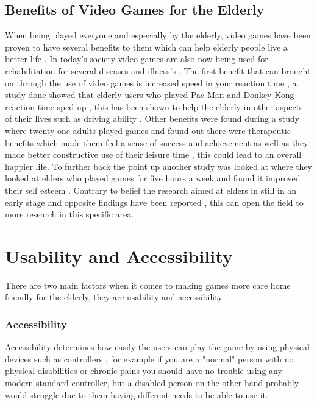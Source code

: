 \documentclass[journal]{IEEEtran}
\begin{document}
\subsection{Benefits of Video Games for the Elderly}
When being played everyone and especially by the elderly, video games have been proven to have several benefits to them which can help elderly people live a better life \cite{noauthor_video_nodate}. In today's society video games are also now being used for rehabilitation for several diseases and illness's \cite{hansen_robot_2011} \cite{gerling_long-term_2015}. The first benefit that can brought on through the use of video games is increased speed in your reaction time \cite{whitcomb_computer_1990} \cite{ijsselsteijn_digital_2007}, a study done showed that elderly users who played Pac Man and Donkey Kong reaction time sped up \cite{whitcomb_computer_1990}, this has been shown to help the elderly in other aspects of their lives such as driving ability \cite{whitcomb_computer_1990}. Other benefits were found during a study where twenty-one adults played games and found out there were therapeutic benefits which made them feel a sense of success and achievement as well as they made better constructive use of their leisure time \cite{whitcomb_computer_1990}, this could lead to an overall happier life. To further back the point up another study was looked at where they looked at elders who played games for five hours a week and found it improved their self esteem \cite{ijsselsteijn_digital_2007}. Contrary to belief the research aimed at elders in still in an early stage and opposite findings have been reported \cite{ijsselsteijn_digital_2007}, this can open the field to more research in this specific area.


\section{Usability and Accessibility}
There are two main factors when it comes to making games more  care home friendly for the elderly, they are usability and accessibility. 
\subsubsection{Accessibility} Accessibility determines how easily the users can play the game by using physical devices such as controllers \cite{hersh_accessibility_2012}, for example if you are a "normal" person with no physical disabilities or chronic pains you should have no trouble using any modern standard controller, but a disabled person on the other hand probably would struggle due to them having different needs to be able to use it. 
\end{document}
